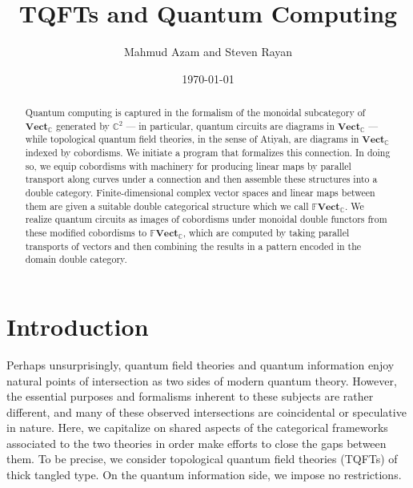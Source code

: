 \documentclass{amsart}
\newcommand{\C}{\mathbb{C}}
\newcommand{\Vect}{\textbf{Vect}}
\newcommand{\FFVect}{\mathbb{F}\textbf{Vect}}
\numberwithin{thm}{section}
\theoremstyle{definition}
\begin{document}
%

\title[TQFTs and Quantum Computing]{TQFTs and Quantum Computing}
\author{Mahmud Azam and Steven Rayan}
\date{\today}
\maketitle

%

\begin{abstract}
Quantum computing is captured in the formalism of the monoidal subcategory of
$\Vect_{\C}$ generated by $\C^2$ --- in particular, quantum circuits are diagrams
in $\Vect_{\C}$ --- while topological quantum field theories, in the sense of
Atiyah, are diagrams in $\Vect_{\C}$ indexed by cobordisms. We initiate a program
that formalizes this connection. In doing so, we equip cobordisms with
machinery for producing linear maps by parallel transport along curves under a
connection and then assemble these structures into a double category. Finite-dimensional complex vector spaces and linear maps between them are given a
suitable double categorical structure which we call $\FFVect_{\C}$. We
realize quantum circuits as images of cobordisms under monoidal double functors
from these modified cobordisms to $\FFVect_{\C}$, which are computed by taking
parallel transports of vectors and then combining the results in a pattern
encoded in the domain double category.
\end{abstract}


\tableofcontents

%

\section{Introduction}

Perhaps unsurprisingly, quantum field theories and quantum information enjoy natural points of intersection as two sides of modern quantum theory.  However, the essential purposes and formalisms inherent to these subjects are rather different, and many of these observed intersections are coincidental or speculative in nature.  Here, we capitalize on shared aspects of the categorical frameworks associated to the two theories in order make efforts to close the gaps between them.  To be precise, we consider topological quantum field theories (TQFTs) of thick tangled type.  On the quantum information side, we impose no restrictions.
\end{document}
